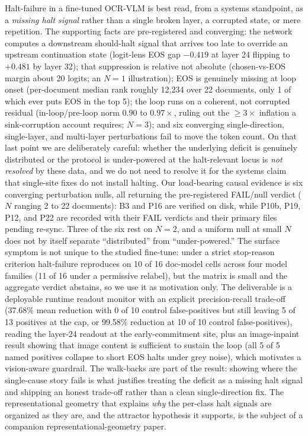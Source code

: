 \documentclass[11pt]{article}
\begin{document}
Halt-failure in a fine-tuned OCR-VLM is best read, from a systems standpoint, as a
\emph{missing halt signal} rather than a single broken layer, a corrupted state, or mere
repetition. The supporting facts are pre-registered and converging: the network computes a
downstream should-halt signal that arrives too late to override an upstream continuation
state (logit-lens EOS gap $-0.419$ at layer 24 flipping to $+0.481$ by layer 32); that
suppression is relative not absolute (chosen-vs-EOS margin about 20 logits; an $N=1$
illustration); EOS is genuinely missing at loop onset (per-document median rank roughly
12{,}234 over 22 documents, only 1 of which ever puts EOS in the top 5); the loop runs on a
coherent, not corrupted residual (in-loop/pre-loop norm $0.90$ to $0.97\times$, ruling out
the $\geq 3\times$ inflation a sink-corruption account requires; $N=3$); and six converging
single-direction, single-layer, and multi-layer perturbations fail to move the token count.
On that last point we are deliberately careful: whether the underlying deficit is genuinely
distributed or the protocol is under-powered at the halt-relevant locus is \emph{not
resolved} by these data, and we do not need to resolve it for the systems claim that
single-site fixes do not install halting. Our load-bearing causal evidence is six converging
perturbation nulls, all returning the pre-registered FAIL/null verdict ($N$ ranging 2 to 22
documents): B3 and P16 are verified on disk, while P10b, P19, P12, and P22 are recorded with
their FAIL verdicts and their primary files pending re-sync. Three of the six rest on $N=2$,
and a uniform null at small $N$ does not by itself separate ``distributed'' from
``under-powered.'' The surface symptom is not unique to the studied fine-tune: under a
strict stop-reason criterion halt-failure reproduces on 10 of 16 doc-model cells across four
model families (11 of 16 under a permissive relabel), but the matrix is small and the
aggregate verdict abstains, so we use it as motivation only. The deliverable is a deployable
runtime readout monitor with an explicit precision-recall trade-off (37.68\% mean reduction
with 0 of 10 control false-positives but still leaving 5 of 13 positives at the cap, or
99.58\% reduction at 10 of 10 control false-positives), reading the layer-24 readout at the
early-commitment site, plus an image-inpaint result showing that image content is sufficient
to sustain the loop (all 5 of 5 named positives collapse to short EOS halts under grey
noise), which motivates a vision-aware guardrail. The walk-backs are part of the result:
showing where the single-cause story fails is what justifies treating the deficit as a
missing halt signal and shipping an honest trade-off rather than a clean single-direction
fix. The representational geometry that explains \emph{why} the per-class halt signals are
organized as they are, and the attractor hypothesis it supports, is the subject of a
companion representational-geometry paper.



\end{document}
